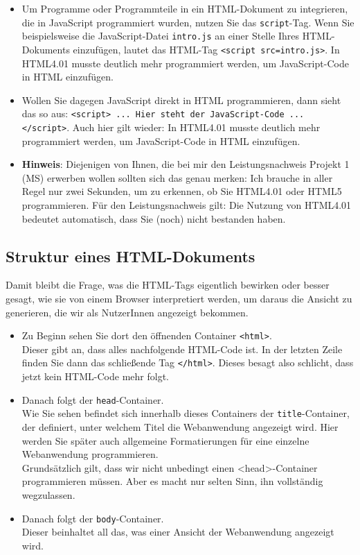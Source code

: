 \begin{itemize}
	\item Um Programme oder Programmteile in ein HTML-Dokument zu integrieren, die in JavaScript programmiert wurden, nutzen Sie das \verb|script|-Tag. Wenn Sie beispielsweise die JavaScript-Datei \verb|intro.js| an einer Stelle Ihres HTML-Dokuments einzufügen, lautet das HTML-Tag \verb|<script src=intro.js>|. In HTML4.01 musste deutlich mehr programmiert werden, um JavaScript-Code in HTML einzufügen.
	\item Wollen Sie dagegen JavaScript direkt in HTML programmieren, dann sieht das so aus: \verb|<script> ... Hier steht der JavaScript-Code ... </script>|. Auch hier gilt wieder: In HTML4.01 musste deutlich mehr programmiert werden, um JavaScript-Code in HTML einzufügen.
	\item \textbf{Hinweis}: Diejenigen von Ihnen, die bei mir den Leistungsnachweis \glqq{}Projekt 1 (MS)\grqq{} erwerben wollen sollten sich das genau merken: Ich brauche in aller Regel nur zwei Sekunden, um zu erkennen, ob Sie HTML4.01 oder HTML5 programmieren. Für den Leistungsnachweis gilt: Die Nutzung von HTML4.01 bedeutet automatisch, dass Sie (noch) nicht bestanden haben.
\end{itemize}

\subsection{Struktur eines HTML-Dokuments}

Damit bleibt die Frage, was die HTML-Tags eigentlich bewirken oder besser gesagt, wie sie von einem Browser interpretiert werden, um daraus die Ansicht zu generieren, die wir als NutzerInnen angezeigt bekommen.\\

\begin{itemize}
	\item Zu Beginn sehen Sie dort den öffnenden Container \verb|<html>|.\\
	Dieser gibt an, dass alles nachfolgende HTML-Code ist. In der letzten Zeile finden Sie dann das schließende Tag \verb|</html>|. Dieses besagt also schlicht, dass jetzt kein HTML-Code mehr folgt.
	\item Danach folgt der \verb|head|-Container.\\
	Wie Sie sehen befindet sich innerhalb dieses Containers der \verb|title|-Container, der definiert, unter welchem Titel die Webanwendung angezeigt wird. Hier werden Sie später auch allgemeine Formatierungen für eine einzelne Webanwendung programmieren.\\
	Grundsätzlich gilt, dass wir nicht unbedingt einen <head>-Container programmieren müssen. Aber es macht nur selten Sinn, ihn vollständig wegzulassen.
	\item Danach folgt der \verb|body|-Container.\\
	Dieser beinhaltet all das, was einer Ansicht der Webanwendung angezeigt wird.
\end{itemize}


